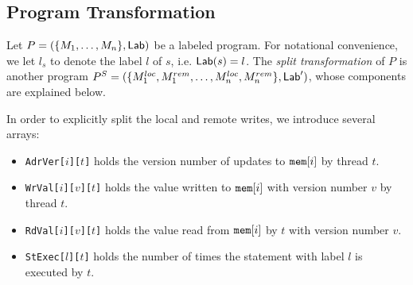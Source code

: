 \documentclass[preprint,9pt]{sigplanconf}
\begin{document}
\subsection{Program Transformation}
\label{subsec:program-transformation}
Let $P=(\{M_1,\ldots,M_n\},\mathsf{Lab})$ be a labeled program.
For notational convenience, we let $l_s$ to denote the label $l$ of $s$, i.e. $\mathsf{Lab}(s)=l$.
The {\em split transformation} of $P$ is another program $P^S=(\{M^{loc}_1,M^{rem}_1,\ldots,M^{loc}_n,M^{rem}_n\},\mathsf{Lab}')$, whose components are explained below.

In order to explicitly split the local and remote writes, we introduce several arrays:
\begin{itemize}
\item {\tt AdrVer[$i$][$t$]} holds the version number of updates to $\mathtt{mem}[i]$ by thread $t$.
\item {\tt WrVal[$i$][$v$][$t$]} holds the value written to $\mathtt{mem}[i]$ with version number $v$ by thread $t$.
\item {\tt RdVal[$i$][$v$][$t$]} holds the value read from $\mathtt{mem}[i]$ by $t$ with version number $v$.
\item {\tt StExec[$l$][$t$]} holds the number of times the statement with label $l$ is executed by $t$.
\end{itemize}
\end{document}
